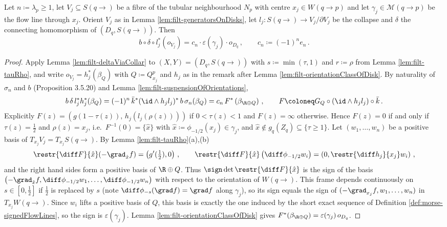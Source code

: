 \begin{proposition}\label{prop:filt-singleFlowLine}
	Let $n\coloneq\lambda_p\geq1$, let $V_j\subseteq S(q\to)$ be a fibre of the tubular neighbourhood $N_p$ with centre $x_j\in W(q\to p)$ and let $\gamma_j\in\mathcal{M}(q\to p)$ be the flow line through $x_j$. Orient $V_j$ as in Lemma \ref{lem:filt-generatorsOnDisks}, let $l_j:S(q\to)\to V_j/\partial V_j$ be the collapse and $\delta$ the connecting homomorphism of $(D_q,S(q\to))$. Then
	\begin{equation*}
		b\circ\delta\circ l_j^*\left(o_{V_j}\right)=c_n\cdot\varepsilon(\gamma_j)\cdot o_{D_q}\,,\qquad c_n\coloneq(-1)^n e_n\,.
	\end{equation*}
\end{proposition}
\begin{proof}
	Apply Lemma \ref{lem:filt-deltaViaCollar} to $(X,Y)=(D_q,S(q\to))$ with $s\coloneq\min(\tau,1)$ and $r\coloneq\rho$ from Lemma \ref{lem:filt-tauRho}, and write $o_{V_j}=h_j^*(\beta_Q)$ with $Q\coloneq Q^p_{x_j}$ and $h_j$ as in the remark after Lemma \ref{lem:filt-orientationClassOfDisk}. By naturality of $\sigma_n$ and $b$ (Proposition 3.5.20) and Lemma \ref{lem:filt-suspensionOfOrientations},
	\begin{equation*}
		b\,\delta\, l_j^*h_j^*(\beta_Q)
		=(-1)^n\,\bar k^*(\id\wedge h_jl_j)^*\,b\,\sigma_n(\beta_Q)
		=c_n\,F^*\left(\beta_{\R\oplus Q}\right)\,,\qquad F\coloneq G_Q\circ(\id\wedge h_jl_j)\circ\bar k\,.
	\end{equation*}
	Explicitly $F(z)=\left(g(1-\tau(z)),\,h_j(l_j(\rho(z)))\right)$ if $0<\tau(z)<1$ and $F(z)=\infty$ otherwise. Hence $F(z)=0$ if and only if $\tau(z)=\frac12$ and $\rho(z)=x_j$, i.e.\ $F^{-1}(0)=\{\hat x\}$ with $\hat x\coloneq\phi_{-1/2}(x_j)\in\gamma_j$, and $\hat x\notin g_q(Z_q)\subseteq\{\tau\geq1\}$. Let $(w_1,\dots,w_n)$ be a positive basis of $T_{x_j}V_j=T_{x_j}S(q\to)$. By Lemma \ref{lem:filt-tauRho}(a),(b)
	\begin{equation*}
		\restr{\diff F}{\hat x}(-\grad_{\hat x}f)=\left(g'(\tfrac12),0\right)\,,\qquad
		\restr{\diff F}{\hat x}\left(\diff\phi_{-1/2}w_i\right)=\left(0,\restr{\diff h_j}{x_j}w_i\right)\,,
	\end{equation*}
	and the right hand sides form a positive basis of $\R\oplus Q$. Thus $\sign\det\restr{\diff F}{\hat x}$ is the sign of the basis $\left(-\grad_{\hat x}f,\diff\phi_{-1/2}w_1,\dots,\diff\phi_{-1/2}w_n\right)$ with respect to the orientation of $W(q\to)$. This frame depends continuously on $s\in[0,\frac12]$ if $\frac12$ is replaced by $s$ (note $\diff\phi_{-s}(\grad f)=\grad f$ along $\gamma_j$), so its sign equals the sign of $(-\grad_{x_j}f,w_1,\dots,w_n)$ in $T_{x_j}W(q\to)$. Since $w_i$ lifts a positive basis of $Q$, this basis is exactly the one induced by the short exact sequence of Definition \ref{def:morse-signedFlowLines}, so the sign is $\varepsilon(\gamma_j)$. Lemma \ref{lem:filt-orientationClassOfDisk} gives $F^*(\beta_{\R\oplus Q})=\varepsilon(\gamma_j)\,o_{D_q}$.
\end{proof}

